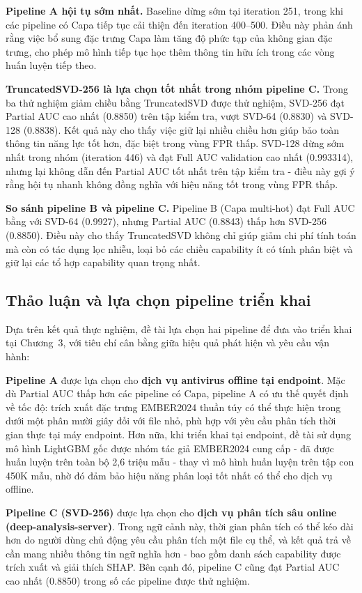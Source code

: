 \textbf{Pipeline A hội tụ sớm nhất.}
Baseline dừng sớm tại iteration 251, trong khi các pipeline có Capa
tiếp tục cải thiện đến iteration 400--500. Điều này phản ánh rằng
việc bổ sung đặc trưng Capa làm tăng độ phức tạp của không gian đặc
trưng, cho phép mô hình tiếp tục học thêm thông tin hữu ích trong
các vòng huấn luyện tiếp theo.

\textbf{TruncatedSVD-256 là lựa chọn tốt nhất trong nhóm pipeline C.}
Trong ba thử nghiệm giảm chiều bằng TruncatedSVD được thử nghiệm, SVD-256 đạt Partial AUC
cao nhất (0.8850) trên tập kiểm tra, vượt SVD-64 (0.8830) và SVD-128
(0.8838). Kết quả này cho thấy việc giữ lại nhiều chiều hơn giúp bảo
toàn thông tin năng lực tốt hơn, đặc biệt trong vùng FPR thấp.
SVD-128 dừng sớm nhất trong nhóm (iteration 446) và đạt Full AUC
validation cao nhất (0.993314), nhưng lại không dẫn đến Partial AUC
tốt nhất trên tập kiểm tra - điều này gợi ý rằng hội tụ nhanh
không đồng nghĩa với hiệu năng tốt trong vùng FPR thấp.

\textbf{So sánh pipeline B và pipeline C.}
Pipeline B (Capa multi-hot) đạt Full AUC bằng với SVD-64 (0.9927),
nhưng Partial AUC (0.8843) thấp hơn SVD-256 (0.8850). Điều này cho
thấy TruncatedSVD không chỉ giúp giảm chi phí tính toán mà còn có
tác dụng lọc nhiễu, loại bỏ các chiều capability ít có tính phân biệt
và giữ lại các tổ hợp capability quan trọng nhất.

\subsection{Thảo luận và lựa chọn pipeline triển khai}

Dựa trên kết quả thực nghiệm, đề tài lựa chọn hai pipeline để đưa
vào triển khai tại Chương~3, với tiêu chí cân bằng giữa hiệu quả
phát hiện và yêu cầu vận hành:

\textbf{Pipeline A} được lựa chọn cho \textbf{dịch vụ antivirus
offline tại endpoint}. Mặc dù Partial AUC thấp hơn các pipeline có
Capa, pipeline A có ưu thế quyết định về tốc độ: trích xuất đặc trưng
EMBER2024 thuần túy có thể thực hiện trong dưới một phân mười giây đối
với file nhỏ, phù hợp với yêu cầu phân tích thời gian thực tại máy endpoint.
Hơn nữa, khi triển khai tại endpoint, đề tài sử dụng mô hình
LightGBM gốc được nhóm tác giả EMBER2024 cung cấp - đã được huấn
luyện trên toàn bộ 2,6 triệu mẫu - thay vì mô hình huấn luyện trên
tập con 450K mẫu, nhờ đó đảm bảo hiệu năng phân loại tốt nhất có thể
cho dịch vụ offline.

\textbf{Pipeline C (SVD-256)} được lựa chọn cho \textbf{dịch vụ phân
tích sâu online (deep-analysis-server)}. Trong ngữ cảnh này, thời gian
phân tích có thể kéo dài hơn do người dùng chủ động yêu cầu phân tích
một file cụ thể, và kết quả trả về cần mang nhiều thông tin ngữ nghĩa
hơn - bao gồm danh sách capability được trích xuất và giải thích
SHAP. Bên cạnh đó, pipeline C cũng đạt Partial AUC cao nhất (0.8850) trong số các
pipeline được thử nghiệm.
